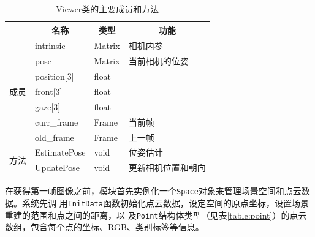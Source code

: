 \begin{table}[htb]
	\centering
	\caption{Viewer类的主要成员和方法}
	\label{table:Viewer}
	\begin{tabular}{|l|m{4cm}|m{3cm}|m{5cm}|}
		\hline
		                    & \multicolumn{1}{c|}{名称}                   & \multicolumn{1}{c|}{类型}          & \multicolumn{1}{c|}{功能}                         \\ \hline
		\multirow{7}{*}{成员} & \centering\arraybackslash intrinsic       & \centering\arraybackslash Matrix & \centering\arraybackslash 相机内参                  \\ \cline{2-4}
		                    & \centering\arraybackslash pose            & \centering\arraybackslash Matrix & \centering\arraybackslash 当前相机的位姿               \\ \cline{2-4}
		                    & \centering\arraybackslash position{[}3{]} & \centering\arraybackslash float  & \centering\arraybackslash \multirow{3}{*}{相机朝向} \\ \cline{2-3}
		                    & \centering\arraybackslash front{[}3{]}    & \centering\arraybackslash float  & \centering\arraybackslash                       \\ \cline{2-3}
		                    & \centering\arraybackslash gaze{[}3{]}     & \centering\arraybackslash float  & \centering\arraybackslash                       \\ \cline{2-4}
		                    & \centering\arraybackslash curr\_frame     & \centering\arraybackslash Frame  & \centering\arraybackslash 当前帧                   \\ \cline{2-4}
		                    & \centering\arraybackslash old\_frame      & \centering\arraybackslash Frame  & \centering\arraybackslash 上一帧                   \\ \hline
		\multirow{2}{*}{方法} & \centering\arraybackslash EstimatePose    & \centering\arraybackslash void   & \centering\arraybackslash 位姿估计                  \\ \cline{2-4}
		                    & \centering\arraybackslash UpdatePose      & \centering\arraybackslash void   & \centering\arraybackslash 更新相机位置和朝向             \\ \hline
	\end{tabular}
\end{table}

\par 在获得第一帧图像之前，模块首先实例化一个\texttt{Space}对象来管理场景空间和点云数据。系统先调
用\texttt{InitData}函数初始化点云数据，设定空间的原点坐标，设置场景重建的范围和点之间的距离，以
及\texttt{Point}结构体类型（见表\ref{table:point}）的点云数组，包含每个点的坐标、RGB、类别标签等信息。

